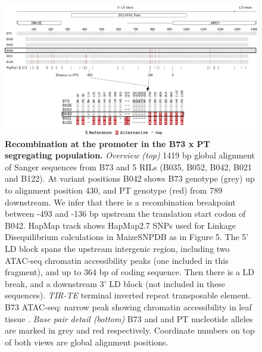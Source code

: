 \begin{subappendices}
\begin{figure}[t]
\begin{center}
\includegraphics[width=\linewidth]{Sup_Figures/Sup_Fig_6.png}
\caption[Recombination at the \hpc promoter in the B73 x PT segregating population.]{\textbf{Recombination at the \hpc promoter in the B73 x PT segregating population.} \textit{Overview (top)} 1419 bp global alignment of Sanger sequences from B73 and 5 RILs (B035, B052, B042, B021 and B122). At variant positions B042 shows B73 genotype (grey) up to alignment position 430, and PT genotype (red) from 789 downstream. We infer that there is  a recombination breakpoint between -493 and -136 bp upstream the translation start codon of B042.
HapMap track shows HapMap2.7 SNPs used for Linkage Disequilibrium calculations in MaizeSNPDB as in Figure 5. The 5' LD block spans the upstream intergenic region, including two ATAC-seq chromatin accessibility peaks (one included in this fragment), and up to 364 bp of \hpc coding sequence. 
Then there is a LD break, and a downstream 3' LD block (not included in these sequences). 
\textit{TIR-TE} terminal inverted repeat transposable element. 
B73 ATAC-seq: narrow peak showing chromatin accessibility in leaf tissue \cite{ricci2019-zj}.
\textit{Base pair detail (bottom)} B73 and and PT nucleotide alleles are marked in grey and red respectively.
Coordinate numbers on top of both views are global alignment positions.
}
\label{figure:Sup:hpc1_promoter}
\end{center}
\end{figure}
\clearpage


\end{subappendices}
